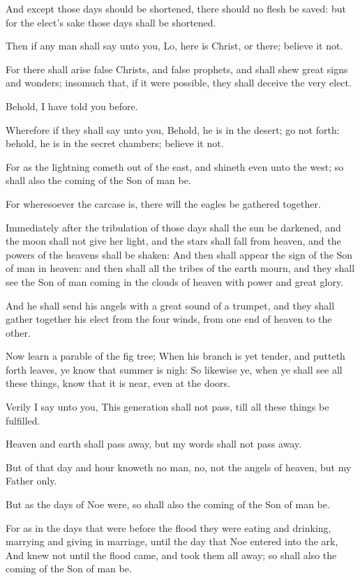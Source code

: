 \verse And except those days should be shortened, there should no flesh be saved: but for the elect's sake those days shall be shortened.

\verse Then if any man shall say unto you, Lo, here is Christ, or there; believe it not.

\verse For there shall arise false Christs, and false prophets, and shall shew great signs and wonders; insomuch that, if it were possible, they shall deceive the very elect.

\verse Behold, I have told you before.

\verse Wherefore if they shall say unto you, Behold, he is in the desert; go not forth: behold, he is in the secret chambers; believe it not.

\verse For as the lightning cometh out of the east, and shineth even unto the west; so shall also the coming of the Son of man be.

\verse For wheresoever the carcase is, there will the eagles be gathered together.

\verse Immediately after the tribulation of those days shall the sun be darkened, and the moon shall not give her light, and the stars shall fall from heaven, and the powers of the heavens shall be shaken: \verse And then shall appear the sign of the Son of man in heaven: and then shall all the tribes of the earth mourn, and they shall see the Son of man coming in the clouds of heaven with power and great glory.

\verse And he shall send his angels with a great sound of a trumpet, and they shall gather together his elect from the four winds, from one end of heaven to the other.

\verse Now learn a parable of the fig tree; When his branch is yet tender, and putteth forth leaves, ye know that summer is nigh: \verse So likewise ye, when ye shall see all these things, know that it is near, even at the doors.

\verse Verily I say unto you, This generation shall not pass, till all these things be fulfilled.

\verse Heaven and earth shall pass away, but my words shall not pass away.

\verse But of that day and hour knoweth no man, no, not the angels of heaven, but my Father only.

\verse But as the days of Noe were, so shall also the coming of the Son of man be.

\verse For as in the days that were before the flood they were eating and drinking, marrying and giving in marriage, until the day that Noe entered into the ark, \verse And knew not until the flood came, and took them all away; so shall also the coming of the Son of man be.

